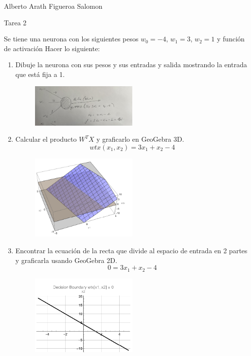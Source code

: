 \documentclass{article}
\begin{document}
Alberto Arath Figueroa Salomon 


Tarea 2
\newpage
\begin{flushleft}
Se tiene una neurona con los siguientes pesos $w_0=-4$, $w_1=3$, $w_2=1$ y función de activación
Hacer lo siguiente:
\begin{enumerate}
\item Dibuje la neurona con sus pesos y sus entradas y salida mostrando la entrada que está fija a 1.
\begin{figure}[H]
  \centering
  \includegraphics[width=0.5\textwidth]{relu.jpg}  %
\end{figure}
\item Calcular el producto $W^T X$ y graficarlo en GeoGebra 3D.
\[ wtx(x_1, x_2) = 3 x_1 + x_2 - 4 \]
\begin{figure}[H]
  \centering
  \includegraphics[width=0.5\textwidth]{Imagen0.png}  %
\end{figure}
\item Encontrar la ecuación de la recta que divide al espacio de entrada en 2 partes y graficarla usando GeoGebra 2D.
\[ 0 = 3 x_1 + x_2 - 4 \]
\begin{figure}[H]
  \centering
  \includegraphics[width=0.5\textwidth]{Imagen1.png}  %

\end{figure}
\end{enumerate}
\end{flushleft}
\end{document}
